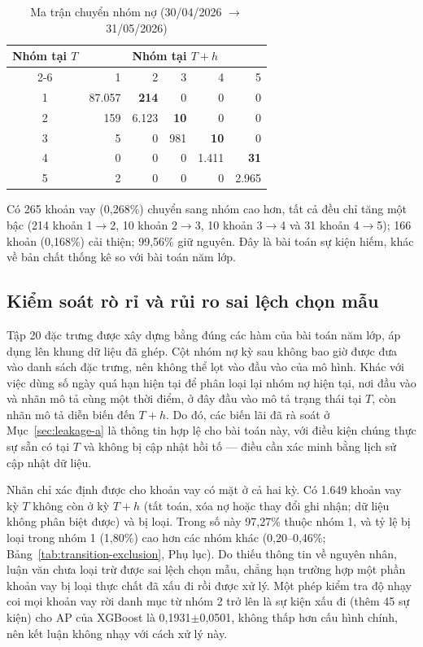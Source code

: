 \begin{table}[H]
\centering
\caption{Ma trận chuyển nhóm nợ (30/04/2026 $\to$ 31/05/2026)}
\label{tab:transition-matrix}
\begin{tabular}{|c|r|r|r|r|r|}
\hline
\multirow{2}{*}{Nhóm tại $T$} & \multicolumn{5}{c|}{Nhóm tại $T+h$}\\
\cline{2-6}
 & 1 & 2 & 3 & 4 & 5\\
\hline
1 & 87.057 & \textbf{214} & 0 & 0 & 0\\
2 & 159 & 6.123 & \textbf{10} & 0 & 0\\
3 & 5 & 0 & 981 & \textbf{10} & 0\\
4 & 0 & 0 & 0 & 1.411 & \textbf{31}\\
5 & 2 & 0 & 0 & 0 & 2.965\\
\hline
\end{tabular}
\end{table}

Có 265 khoản vay (0,268\%) chuyển sang nhóm cao hơn, tất cả đều chỉ tăng một bậc (214 khoản 1$\to$2, 10 khoản 2$\to$3, 10 khoản 3$\to$4 và 31 khoản 4$\to$5); 166 khoản (0,168\%) cải thiện; 99,56\% giữ nguyên. Đây là bài toán sự kiện hiếm, khác về bản chất thống kê so với bài toán năm lớp.

\subsection{Kiểm soát rò rỉ và rủi ro sai lệch chọn mẫu}
\label{sec:transition-leakage}
\label{sec:transition-exclusion}

Tập 20 đặc trưng được xây dựng bằng đúng các hàm của bài toán năm lớp, áp dụng lên khung dữ liệu đã ghép. Cột nhóm nợ kỳ sau không bao giờ được đưa vào danh sách đặc trưng, nên không thể lọt vào đầu vào của mô hình. Khác với việc dùng số ngày quá hạn hiện tại để phân loại lại nhóm nợ hiện tại, nơi đầu vào và nhãn mô tả cùng một thời điểm, ở đây đầu vào mô tả trạng thái tại $T$, còn nhãn mô tả diễn biến đến $T+h$. Do đó, các biến lãi đã rà soát ở Mục~\ref{sec:leakage-a} là thông tin hợp lệ cho bài toán này, với điều kiện chúng thực sự sẵn có tại $T$ và không bị cập nhật hồi tố --- điều cần xác minh bằng lịch sử cập nhật dữ liệu.

Nhãn chỉ xác định được cho khoản vay có mặt ở cả hai kỳ. Có 1.649 khoản vay kỳ $T$ không còn ở kỳ $T+h$ (tất toán, xóa nợ hoặc thay đổi ghi nhận; dữ liệu không phân biệt được) và bị loại. Trong số này 97,27\% thuộc nhóm 1, và tỷ lệ bị loại trong nhóm 1 (1,80\%) cao hơn các nhóm khác (0,20--0,46\%; Bảng~\ref{tab:transition-exclusion}, Phụ lục). Do thiếu thông tin về nguyên nhân, luận văn chưa loại trừ được sai lệch chọn mẫu, chẳng hạn trường hợp một phần khoản vay bị loại thực chất đã xấu đi rồi được xử lý. Một phép kiểm tra độ nhạy coi mọi khoản vay rời danh mục từ nhóm 2 trở lên là sự kiện xấu đi (thêm 45 sự kiện) cho AP của XGBoost là 0,1931$\pm$0,0501, không thấp hơn cấu hình chính, nên kết luận không nhạy với cách xử lý này.

